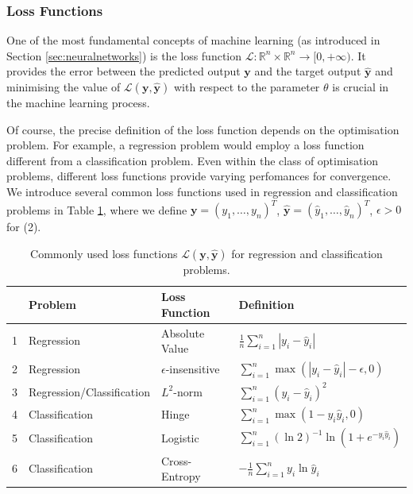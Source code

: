 \documentclass[a4paper,11pt,titlepage]{article}
\theoremstyle{definition}
\theoremstyle{plain}
\theoremstyle{remark}
\begin{document}
\subsubsection{Loss Functions}

One of the most fundamental concepts of machine learning (as introduced in Section \ref{sec:neuralnetworks}) is the loss function $\mathcal{L}: \mathbb{R}^n \times \mathbb{R}^n \to [0, +\infty )$. It provides the error between the predicted output $\mathbf{y}$ and the target output $\mathbf{\hat{y}}$ and minimising the value of $\mathcal{L}(\mathbf{y}, \mathbf{\hat{y}})$ with respect to the parameter $\theta$ is crucial in the machine learning process. 

Of course, the precise definition of the loss function depends on the optimisation problem. For example, a regression problem would employ a loss function different from a classification problem. Even within the class of optimisation problems, different loss functions provide varying perfomances for convergence. We introduce several common loss functions used in regression and classification problems in Table \ref{tab:lfd}, where we define $\mathbf{y} = \left(y_1, \dots, y_n\right)^T$, $\mathbf{\hat{y}} = \left(\hat{y}_1, \dots, \hat{y}_n\right)^T$, $\epsilon > 0$ for (2).
\begin{table}[htbp]
    \centering
    \begin{tabular}{llll}
        \toprule
          & Problem  & Loss Function  &  Definition \\
        \midrule
        1 & Regression       & Absolute Value            & $\frac{1}{n}\sum_{i=1}^n |y_i - \hat{y}_i|$      \\
        2 &Regression       & $\epsilon$-insensitive   & $\sum_{i=1}^n \max{(|y_i - \hat{y}_i| - \epsilon, 0)}$\\
        3 & Regression/Classification       & $L^2$-norm                   & $\sum_{i=1}^n\left(y_i - \hat{y}_i\right)^2$        \\
        4 & Classification  & Hinge                     & $\sum_{i=1}^n\max{(1-y_i\hat{y}_i, 0)}$ \\
        5 & Classification  & Logistic                  & $\sum_{i=1}^n \left(\ln 2\right)^{-1}\ln(1 + e^{-y_i\hat{y}_i})$ \\
        6 & Classification  & Cross-Entropy             & $- \frac{1}{n} \sum_{i=1}^n y_i\ln \hat{y}_i$\\ 
        \bottomrule
    \end{tabular}
    \caption{Commonly used loss functions $\mathcal{L}(\mathbf{y}, \mathbf{\hat{y}})$ for regression and classification problems.}
    \label{tab:lfd}
\end{table}
\end{document}
